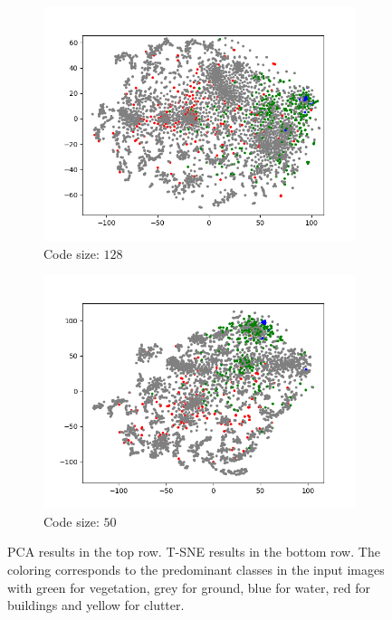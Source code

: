 \begin{figure}[H]
\begin{subfigure}{.25\textwidth}
        \includegraphics[width=\textwidth]{images/figures/experiments_latent/convolutional_dim128_classes.png}   
        \caption{Code size: $128$}
    \end{subfigure}%
    \begin{subfigure}{.25\textwidth}
        \centering
        \includegraphics[width=\textwidth]{images/figures/experiments_latent/convolutional_dim50_classes.png}
        \caption{Code size: $50$}
    \end{subfigure}
    \caption{PCA results in the top row. 
    T-SNE results in the bottom row. 
    The coloring corresponds to the predominant classes in the input images with green for vegetation, 
    grey for ground, blue for water, red for buildings and yellow for clutter.} \label{figure_classes_convolutional}
\end{figure} 

